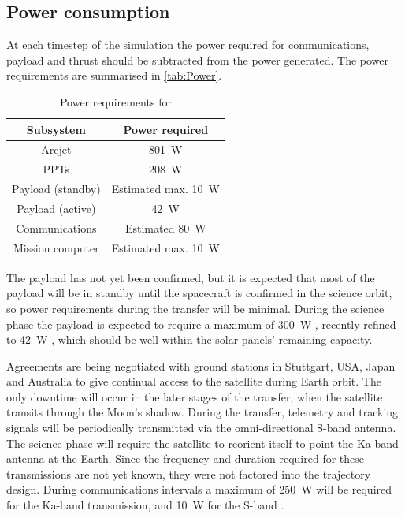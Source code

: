 
\subsection{Power consumption} \label{sub:Power-consumption}

At each timestep of the simulation the power required for communications, payload and thrust should be subtracted from the power generated. The power requirements are summarised in \autoref{tab:Power}.

\begin{table}[b]
\centering
\caption{Power requirements for \BW} \label{tab:Power}
\begin{tabular}{cc} \toprule
Subsystem & Power required \tabularnewline\midrule 
Arcjet &  801~W \tabularnewline
PPTs &  208~W \tabularnewline
Payload (standby) & Estimated max. 10~W \tabularnewline
Payload (active) & 42~W \tabularnewline
Communications & Estimated 80~W \tabularnewline
Mission computer & Estimated max. 10~W \tabularnewline
\bottomrule
\end{tabular}
\end{table}

The payload has not yet been confirmed, but it is expected that most of the payload will be in standby until the spacecraft is confirmed in the science orbit, so power requirements during the transfer will be minimal. During the science phase the payload is expected to require a maximum of 300~W \parencite{web_BW-1}, recently refined to 42~W \parencite{Laufer_thesis}, which should be well within the solar panels' remaining capacity.

Agreements are being negotiated with ground stations in Stuttgart, USA, Japan and Australia to give continual access to the satellite during Earth orbit. The only downtime will occur in the later stages of the transfer, when the satellite transits through the Moon's shadow. %
During the transfer, telemetry and tracking signals will be periodically transmitted via the omni-directional S-band antenna. The science phase will require the satellite to reorient itself to point the Ka-band antenna at the Earth. Since the frequency and duration required for these transmissions are not yet known, they were not factored into the trajectory design. During communications intervals a maximum of 250~W will be required for the Ka-band transmission, and 10~W for the S-band \parencite[recently revised to 60~W for Ka-band and 20~W for S-band, ][]{Laufer_thesis}.

